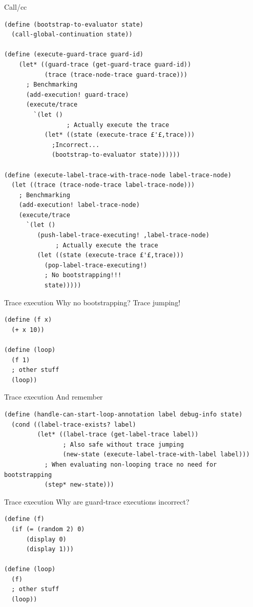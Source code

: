 \documentclass{beamer}
\begin{document}
\begin{frame}[fragile]{Call/cc}
\begin{lstlisting}[basicstyle = \tiny\ttfamily, escapechar = £]
(define (bootstrap-to-evaluator state)
  (call-global-continuation state))
  
(define (execute-guard-trace guard-id)
    (let* ((guard-trace (get-guard-trace guard-id))
           (trace (trace-node-trace guard-trace)))
      ; Benchmarking
      (add-execution! guard-trace)
      (execute/trace
        `(let ()
                 ; Actually execute the trace              
           (let* ((state (execute-trace £'£,trace)))
             ;Incorrect...
             (bootstrap-to-evaluator state))))))
  
(define (execute-label-trace-with-trace-node label-trace-node)
  (let ((trace (trace-node-trace label-trace-node)))
    ; Benchmarking
    (add-execution! label-trace-node)
    (execute/trace
      `(let ()
         (push-label-trace-executing! ,label-trace-node)
              ; Actually execute the trace
         (let ((state (execute-trace £'£,trace))) 
           (pop-label-trace-executing!)
           ; No bootstrapping!!!
           state)))))
\end{lstlisting}
\end{frame}

\begin{frame}[fragile]{Trace execution}
Why no bootstrapping? Trace jumping!
\begin{lstlisting}[basicstyle = \footnotesize\ttfamily, escapechar = £]
(define (f x)
  (+ x 10))
  
(define (loop)
  (f 1)
  ; other stuff
  (loop))
\end{lstlisting}
\end{frame}

\begin{frame}[fragile]{Trace execution}
And remember
\begin{lstlisting}[basicstyle = \footnotesize\ttfamily, escapechar = £]
(define (handle-can-start-loop-annotation label debug-info state)
  (cond ((label-trace-exists? label)
         (let* ((label-trace (get-label-trace label))
                ; Also safe without trace jumping
                (new-state (execute-label-trace-with-label label)))
           ; When evaluating non-looping trace no need for bootstrapping
           (step* new-state)))
\end{lstlisting}
\end{frame}

\begin{frame}[fragile]{Trace execution}
Why are guard-trace executions incorrect?
\begin{lstlisting}[basicstyle = \footnotesize\ttfamily, escapechar = £]
(define (f)
  (if (= (random 2) 0)
      (display 0)
      (display 1)))
  
(define (loop)
  (f)
  ; other stuff
  (loop))
\end{lstlisting}
\end{frame}
\end{document}
